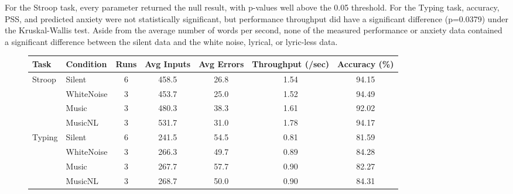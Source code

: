 \documentclass[journal]{IEEEtran}
\begin{document}
For the Stroop task, every parameter returned the null result, with p-values well above the 0.05 threshold. For the Typing task, accuracy, PSS, and predicted anxiety were not statistically significant, but performance throughput did have a significant difference (p=0.0379) under the Kruskal-Wallis test. Aside from the average number of words per second, none of the measured performance or anxiety data contained a significant difference between the silent data and the white noise, lyrical, or lyric-less data.

\begin{figure}[!p]
    \centering
    \small %
    
    \label{tab:performance_metrics}
    \begin{tabular}{llccccc}
        \toprule
        \textbf{Task} & \textbf{Condition} & \textbf{Runs} & \textbf{Avg Inputs} & \textbf{Avg Errors} & \textbf{Throughput (/sec)} & \textbf{Accuracy (\%)} \\
        \midrule
        \multirow{4}{*}{Stroop} 
        & Silent     & 6 & 458.5 & 26.8 & 1.54 & 94.15 \\
        & WhiteNoise & 3 & 453.7 & 25.0 & 1.52 & 94.49 \\
        & Music      & 3 & 480.3 & 38.3 & 1.61 & 92.02 \\
        & MusicNL    & 3 & 531.7 & 31.0 & 1.78 & 94.17 \\
        \midrule
        \multirow{4}{*}{Typing} 
        & Silent     & 6 & 241.5 & 54.5 & 0.81 & 81.59 \\
        & WhiteNoise & 3 & 266.3 & 49.7 & 0.89 & 84.28 \\
        & Music      & 3 & 267.7 & 57.7 & 0.90 & 82.27 \\
        & MusicNL    & 3 & 268.7 & 50.0 & 0.90 & 84.31 \\
        \bottomrule
    \end{tabular}
    \vspace{0.3cm} %


\end{figure}
\end{document}

